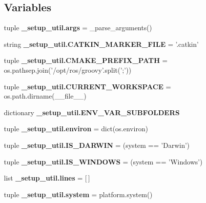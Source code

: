 \subsection*{\-Variables}
\begin{DoxyCompactItemize}
\item 
tuple {\bf \-\_\-setup\-\_\-util.\-args} = \-\_\-parse\-\_\-arguments()
\item 
string {\bf \-\_\-setup\-\_\-util.\-C\-A\-T\-K\-I\-N\-\_\-\-M\-A\-R\-K\-E\-R\-\_\-\-F\-I\-L\-E} = '.catkin'
\item 
tuple {\bf \-\_\-setup\-\_\-util.\-C\-M\-A\-K\-E\-\_\-\-P\-R\-E\-F\-I\-X\-\_\-\-P\-A\-T\-H} = os.\-pathsep.\-join('/opt/ros/groovy'.split(';'))
\item 
tuple {\bf \-\_\-setup\-\_\-util.\-C\-U\-R\-R\-E\-N\-T\-\_\-\-W\-O\-R\-K\-S\-P\-A\-C\-E} = os.\-path.\-dirname(\-\_\-\-\_\-file\-\_\-\-\_\-)
\item 
dictionary {\bf \-\_\-setup\-\_\-util.\-E\-N\-V\-\_\-\-V\-A\-R\-\_\-\-S\-U\-B\-F\-O\-L\-D\-E\-R\-S}
\item 
tuple {\bf \-\_\-setup\-\_\-util.\-environ} = dict(os.\-environ)
\item 
tuple {\bf \-\_\-setup\-\_\-util.\-I\-S\-\_\-\-D\-A\-R\-W\-I\-N} = (system == '\-Darwin')
\item 
tuple {\bf \-\_\-setup\-\_\-util.\-I\-S\-\_\-\-W\-I\-N\-D\-O\-W\-S} = (system == '\-Windows')
\item 
list {\bf \-\_\-setup\-\_\-util.\-lines} = [$\,$]
\item 
tuple {\bf \-\_\-setup\-\_\-util.\-system} = platform.\-system()
\end{DoxyCompactItemize}

